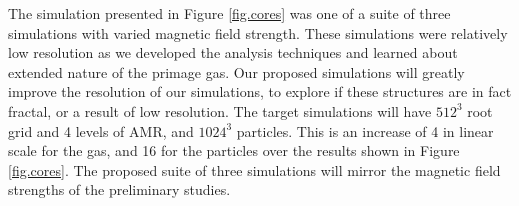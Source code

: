 The simulation presented in Figure \ref{fig.cores} was one of a suite of three
simulations with varied magnetic field strength.  These simulations were
relatively low resolution as we developed the analysis techniques and learned
about extended nature of the primage gas.
Our proposed simulations will greatly improve the resolution of our simulations,
to explore if these structures are in fact fractal, or a result of low
resolution. The target simulations will have $512^3$ root grid and 4 levels of
AMR, and $1024^3$ particles.  This is an increase of 4 in linear scale for the
gas, and 16 for the particles over the results shown in Figure \ref{fig.cores}.
The proposed suite of three simulations will mirror the magnetic field strengths
of the preliminary studies.


